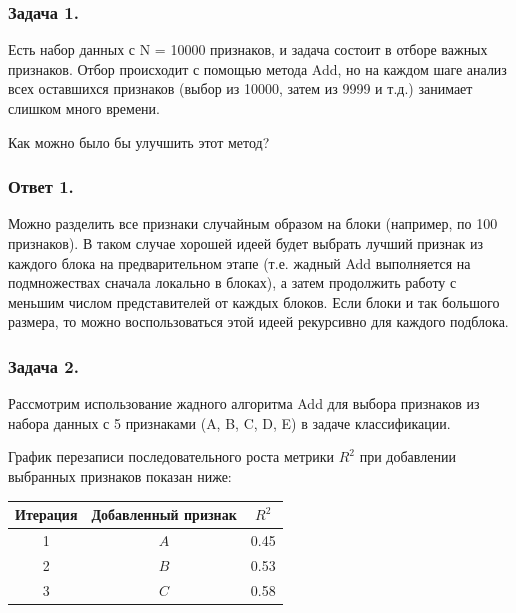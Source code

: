 \subsubsection{Задача 1.}

Есть набор данных с N = 10000 признаков, и задача состоит в отборе важных признаков. Отбор происходит с помощью метода Add, но на каждом шаге анализ всех оставшихся признаков (выбор из 10000, затем из 9999 и т.д.) занимает слишком много времени.

Как можно было бы улучшить этот метод?

\subsubsection{Ответ 1.}

Можно разделить все признаки случайным образом на блоки (например, по 100 признаков). В таком случае хорошей идеей будет выбрать лучший признак из каждого блока на предварительном этапе (т.е. жадный Add выполняется на подмножествах сначала локально в блоках), а затем продолжить работу с меньшим числом представителей от каждых блоков. Если блоки и так большого размера, то можно воспользоваться этой идеей рекурсивно для каждого подблока.

\subsubsection{Задача 2.}

Рассмотрим использование жадного алгоритма Add для выбора признаков из набора данных с 5 признаками ({A, B, C, D, E}) в задаче классификации.

График перезаписи последовательного роста метрики $R^2$ при добавлении выбранных признаков показан ниже:

\begin{table}[h!]
    \centering
    \begin{tabular}{|c|c|c|}
        \hline
        \textbf{Итерация} & \textbf{Добавленный признак} & \boldmath${R^2}$ \\ \hline
        1                 & $A$                          & 0.45             \\ \hline
        2                 & $B$                          & 0.53             \\ \hline
        3                 & $C$                          & 0.58             \\ \hline
    \end{tabular}
\end{table}

